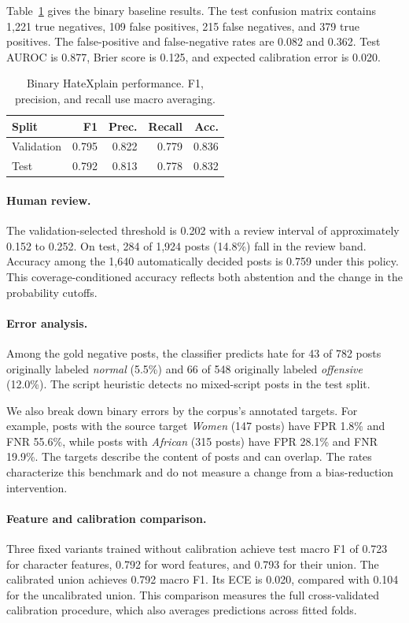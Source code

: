 \documentclass[11pt]{article}
\begin{document}
Table~\ref{tab:benchmark} gives the binary baseline results. The test confusion matrix contains 1,221 true negatives, 109 false positives, 215 false negatives, and 379 true positives. The false-positive and false-negative rates are 0.082 and 0.362. Test AUROC is 0.877, Brier score is 0.125, and expected calibration error is 0.020.

\begin{table}[t]
\centering
\small
\begin{tabular}{lrrrr}
\toprule
Split & F1 & Prec. & Recall & Acc. \\
\midrule
Validation & 0.795 & 0.822 & 0.779 & 0.836 \\
Test & 0.792 & 0.813 & 0.778 & 0.832 \\
\bottomrule
\end{tabular}
\caption{Binary HateXplain performance. F1, precision, and recall use macro averaging.}
\label{tab:benchmark}
\end{table}

\paragraph{Human review.}
The validation-selected threshold is 0.202 with a review interval of approximately 0.152 to 0.252. On test, 284 of 1,924 posts (14.8\%) fall in the review band. Accuracy among the 1,640 automatically decided posts is 0.759 under this policy. This coverage-conditioned accuracy reflects both abstention and the change in the probability cutoffs.

\paragraph{Error analysis.}
Among the gold negative posts, the classifier predicts hate for 43 of 782 posts originally labeled \textit{normal} (5.5\%) and 66 of 548 originally labeled \textit{offensive} (12.0\%). The script heuristic detects no mixed-script posts in the test split.

We also break down binary errors by the corpus's annotated targets. For example, posts with the source target \textit{Women} (147 posts) have FPR 1.8\% and FNR 55.6\%, while posts with \textit{African} (315 posts) have FPR 28.1\% and FNR 19.9\%. The targets describe the content of posts and can overlap. The rates characterize this benchmark and do not measure a change from a bias-reduction intervention.

\paragraph{Feature and calibration comparison.}
Three fixed variants trained without calibration achieve test macro F1 of 0.723 for character features, 0.792 for word features, and 0.793 for their union. The calibrated union achieves 0.792 macro F1. Its ECE is 0.020, compared with 0.104 for the uncalibrated union. This comparison measures the full cross-validated calibration procedure, which also averages predictions across fitted folds.
\end{document}
